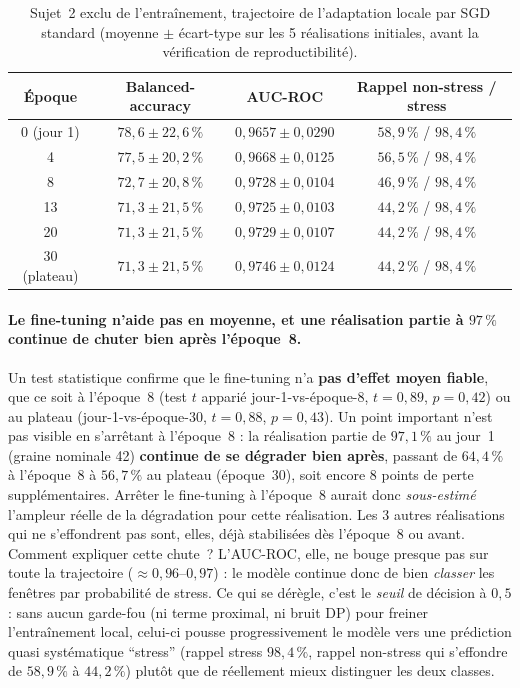\documentclass{acmart}
\begin{document}
\begin{table}[h!]
  \centering
  \small
  \caption{Sujet~2 exclu de l'entraînement, trajectoire de l'adaptation
  locale par SGD standard (moyenne $\pm$ écart-type sur les 5 réalisations
  initiales, avant la vérification de reproductibilité).}
  \label{tab:new_joiner}
  \begin{tabular}{cccc}
    \toprule
    Époque & Balanced-accuracy & AUC-ROC & Rappel non-stress / stress \\
    \midrule
    0 (jour 1) & $78{,}6 \pm 22{,}6\,\%$ & $0{,}9657 \pm 0{,}0290$ & $58{,}9\,\%$ / $98{,}4\,\%$ \\
    4          & $77{,}5 \pm 20{,}2\,\%$ & $0{,}9668 \pm 0{,}0125$ & $56{,}5\,\%$ / $98{,}4\,\%$ \\
    8          & $72{,}7 \pm 20{,}8\,\%$ & $0{,}9728 \pm 0{,}0104$ & $46{,}9\,\%$ / $98{,}4\,\%$ \\
    13         & $71{,}3 \pm 21{,}5\,\%$ & $0{,}9725 \pm 0{,}0103$ & $44{,}2\,\%$ / $98{,}4\,\%$ \\
    20         & $71{,}3 \pm 21{,}5\,\%$ & $0{,}9729 \pm 0{,}0107$ & $44{,}2\,\%$ / $98{,}4\,\%$ \\
    30 (plateau) & $71{,}3 \pm 21{,}5\,\%$ & $0{,}9746 \pm 0{,}0124$ & $44{,}2\,\%$ / $98{,}4\,\%$ \\
    \bottomrule
  \end{tabular}
\end{table}

\paragraph{Le fine-tuning n'aide pas en moyenne, et une réalisation partie
à $97\,\%$ continue de chuter bien après l'époque~8.} Un test statistique
confirme que le fine-tuning n'a \textbf{pas d'effet moyen fiable}, que ce
soit à l'époque~8 (test $t$ apparié jour-1-vs-époque-8, $t=0{,}89$,
$p=0{,}42$) ou au plateau (jour-1-vs-époque-30, $t=0{,}88$, $p=0{,}43$). Un
point important n'est pas visible en s'arrêtant à l'époque~8 : la
réalisation partie de $97{,}1\,\%$ au jour~1 (graine nominale 42)
\textbf{continue de se dégrader bien après}, passant de $64{,}4\,\%$ à
l'époque~8 à $56{,}7\,\%$ au plateau (époque~30), soit encore 8 points de
perte supplémentaires. Arrêter le fine-tuning à l'époque~8 aurait donc
\emph{sous-estimé} l'ampleur réelle de la dégradation pour cette
réalisation. Les 3 autres réalisations qui ne s'effondrent pas sont, elles,
déjà stabilisées dès l'époque~8 ou avant. Comment expliquer cette chute~?
L'AUC-ROC, elle, ne bouge presque pas sur toute la trajectoire
($\approx 0{,}96$--$0{,}97$) : le modèle continue donc de bien
\emph{classer} les fenêtres par probabilité de stress. Ce qui se dérègle,
c'est le \emph{seuil} de décision à $0{,}5$ : sans aucun garde-fou (ni terme
proximal, ni bruit DP) pour freiner l'entraînement local, celui-ci pousse
progressivement le modèle vers une prédiction quasi systématique ``stress''
(rappel stress $98{,}4\,\%$, rappel non-stress qui s'effondre de
$58{,}9\,\%$ à $44{,}2\,\%$) plutôt que de réellement mieux distinguer les
deux classes.
\end{document}
